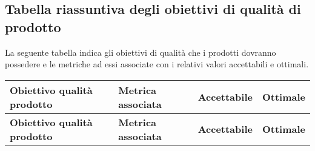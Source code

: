 \documentclass[../piano_di_qualifica.tex]{subfiles}
\begin{document}
\subsection{Tabella riassuntiva degli obiettivi di qualità di prodotto}
La seguente tabella indica gli obiettivi di qualità che i prodotti dovranno possedere e le metriche ad essi associate con i relativi valori accettabili e ottimali.

\begin{center}
	\begin{longtable}{|p{5cm}|p{6cm}|c|c|}
		\hline
		\rowcolor{lightgray}
		\textbf{Obiettivo qualità prodotto}   & \textbf{Metrica associata}                             & \textbf{Accettabile} & \textbf{Ottimale} \\
		\hline
		\endfirsthead
		\hline
		\rowcolor{lightgray}
		\textbf{Obiettivo qualità prodotto}   & \textbf{Metrica associata}                             & \textbf{Accettabile} & \textbf{Ottimale} \\
		\hline
		\endhead


\end{longtable}
\end{center}
\end{document}
